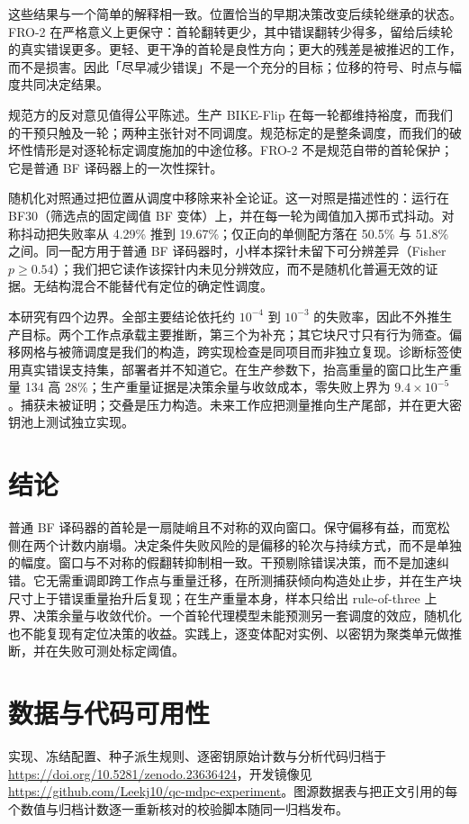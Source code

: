 \documentclass[UTF8,a4paper,10pt,twocolumn]{ctexart}
\begin{document}
这些结果与一个简单的解释相一致。位置恰当的早期决策改变后续轮继承的状态。FRO-2 在严格意义上更保守：首轮翻转更少，其中错误翻转少得多，留给后续轮的真实错误更多。更轻、更干净的首轮是良性方向；更大的残差是被推迟的工作，而不是损害。因此「尽早减少错误」不是一个充分的目标；位移的符号、时点与幅度共同决定结果。

规范方的反对意见值得公平陈述。生产 BIKE-Flip 在每一轮都维持裕度，而我们的干预只触及一轮；两种主张针对不同调度。规范标定的是整条调度，而我们的破坏性情形是对逐轮标定调度施加的中途位移。FRO-2 不是规范自带的首轮保护；它是普通 BF 译码器上的一次性探针。

随机化对照通过把位置从调度中移除来补全论证。这一对照是描述性的：运行在 BF30（筛选点的固定阈值 BF 变体）上，并在每一轮为阈值加入掷币式抖动。对称抖动把失败率从 4.29\% 推到 19.67\%；仅正向的单侧配方落在 50.5\% 与 51.8\% 之间。同一配方用于普通 BF 译码器时，小样本探针未留下可分辨差异（Fisher $p\ge0.54$）；我们把它读作该探针内未见分辨效应，而不是随机化普遍无效的证据。无结构混合不能替代有定位的确定性调度。

本研究有四个边界。全部主要结论依托约 $10^{-4}$ 到 $10^{-3}$ 的失败率，因此不外推生产目标。两个工作点承载主要推断，第三个为补充；其它块尺寸只有行为筛查。偏移网格与被筛调度是我们的构造，跨实现检查是同项目而非独立复现。诊断标签使用真实错误支持集，部署者并不知道它。在生产参数下，抬高重量的窗口比生产重量 134 高 28\%；生产重量证据是决策余量与收敛成本，零失败上界为 $9.4\times10^{-5}$。捕获未被证明；交叠是压力构造。未来工作应把测量推向生产尾部，并在更大密钥池上测试独立实现。

\section{结论}\label{sec:conclusion}

普通 BF 译码器的首轮是一扇陡峭且不对称的双向窗口。保守偏移有益，而宽松侧在两个计数内崩塌。决定条件失败风险的是偏移的轮次与持续方式，而不是单独的幅度。窗口与不对称的假翻转抑制相一致。干预剔除错误决策，而不是加速纠错。它无需重调即跨工作点与重量迁移，在所测捕获倾向构造处止步，并在生产块尺寸上于错误重量抬升后复现；在生产重量本身，样本只给出 rule-of-three 上界、决策余量与收敛代价。一个首轮代理模型未能预测另一套调度的效应，随机化也不能复现有定位决策的收益。实践上，逐变体配对实例、以密钥为聚类单元做推断，并在失败可测处标定阈值。
\section*{数据与代码可用性}
实现、冻结配置、种子派生规则、逐密钥原始计数与分析代码归档于 \url{https://doi.org/10.5281/zenodo.23636424}，开发镜像见 \url{https://github.com/Leekj10/qc-mdpc-experiment}。图源数据表与把正文引用的每个数值与归档计数逐一重新核对的校验脚本随同一归档发布。



\end{document}
